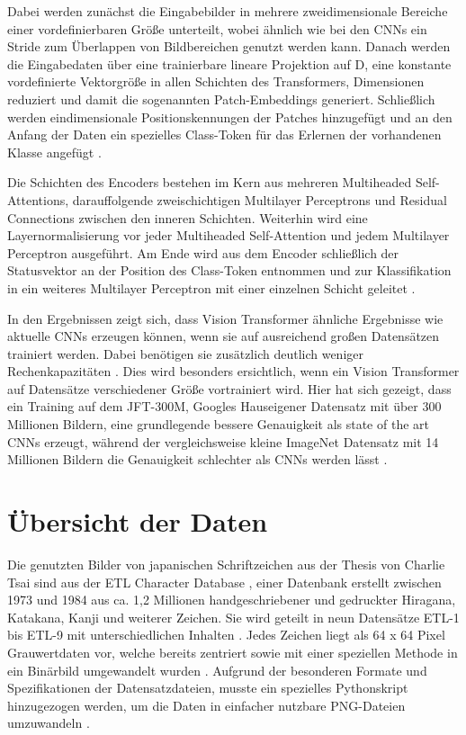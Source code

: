 \documentclass[twoside,a4paper]{IEEEtran}
\begin{document}
Dabei werden zunächst die Eingabebilder in mehrere zweidimensionale Bereiche einer vordefinierbaren Größe unterteilt, wobei ähnlich wie bei den CNNs ein Stride zum Überlappen von Bildbereichen genutzt werden kann. Danach werden die Eingabedaten über eine trainierbare lineare Projektion auf D, eine konstante vordefinierte Vektorgröße in allen Schichten des Transformers, Dimensionen reduziert und damit die sogenannten Patch-Embeddings generiert. Schließlich werden eindimensionale Positionskennungen der Patches hinzugefügt und an den Anfang der Daten ein spezielles Class-Token für das Erlernen der vorhandenen Klasse angefügt  \cite[S.3]{VIT}. 

Die Schichten des Encoders bestehen im Kern aus mehreren Multiheaded Self-Attentions, darauffolgende zweischichtigen Multilayer Perceptrons und Residual Connections zwischen den inneren Schichten. Weiterhin wird eine Layernormalisierung vor jeder Multiheaded Self-Attention und jedem Multilayer Perceptron ausgeführt. Am Ende wird aus dem Encoder schließlich der Statusvektor an der Position des Class-Token entnommen und zur Klassifikation in ein weiteres Multilayer Perceptron mit einer einzelnen Schicht geleitet \cite[S.3-4]{VIT}. 

In den Ergebnissen zeigt sich, dass Vision Transformer ähnliche Ergebnisse wie aktuelle CNNs erzeugen können, wenn sie auf ausreichend großen Datensätzen trainiert werden. Dabei benötigen sie zusätzlich deutlich weniger Rechenkapazitäten \cite[S.5]{VIT}. Dies wird besonders ersichtlich, wenn ein Vision Transformer auf Datensätze verschiedener Größe vortrainiert wird. Hier hat sich gezeigt, dass ein Training auf dem JFT-300M, Googles Hauseigener Datensatz mit über 300 Millionen Bildern, eine grundlegende bessere Genauigkeit als state of the art CNNs erzeugt, während der vergleichsweise kleine ImageNet Datensatz mit 14 Millionen Bildern \cite{IMAGENET} die Genauigkeit schlechter als CNNs werden lässt \cite{JFT}.
\section{Übersicht der Daten} %
Die genutzten Bilder von japanischen Schriftzeichen aus der Thesis von Charlie Tsai sind aus der ETL Character Database \cite[S.2-3]{RHC}, einer Datenbank erstellt zwischen 1973 und 1984 aus ca. 1,2 Millionen handgeschriebener und gedruckter Hiragana, Katakana, Kanji und weiterer Zeichen. Sie wird geteilt in neun Datensätze ETL-1 bis ETL-9 mit unterschiedlichen Inhalten \cite{ETL}. Jedes Zeichen liegt als 64 x 64 Pixel Grauwertdaten vor, welche bereits zentriert sowie mit einer speziellen Methode in ein Binärbild umgewandelt wurden \cite[S.3]{RHC}. Aufgrund der besonderen Formate und Spezifikationen der Datensatzdateien, musste ein spezielles Pythonskript hinzugezogen werden, um die Daten in einfacher nutzbare PNG-Dateien umzuwandeln \cite{ETL_FORMATS}. 
\end{document}
